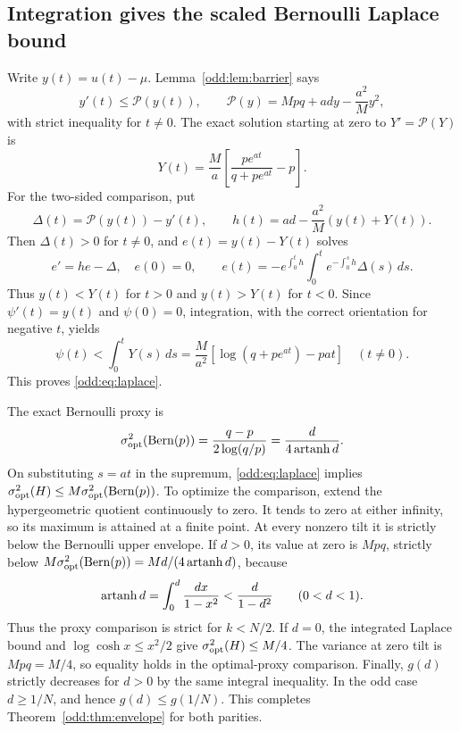 \subsection{Integration gives the scaled Bernoulli Laplace bound}
Write $y(t)=u(t)-\mu$. Lemma~\ref{odd:lem:barrier} says
\[
 y'(t)\le \mathcal P(y(t)),\qquad
 \mathcal P(y)=Mpq+ady-\frac{a^2}{M}y^2,
\]
with strict inequality for $t\ne0$. The exact solution starting at zero to
$Y'=\mathcal P(Y)$ is
\begin{equation}\label{odd:eq:Y}
 Y(t)=\frac{M}{a}\left[\frac{pe^{at}}{q+pe^{at}}-p\right].
\end{equation}
For the two-sided comparison, put
\[
 \Delta(t)=\mathcal P(y(t))-y'(t),\qquad
 h(t)=ad-\frac{a^2}{M}(y(t)+Y(t)).
\]
Then $\Delta(t)>0$ for $t\ne0$, and $e(t)=y(t)-Y(t)$ solves
\[
 e'=he-\Delta,\quad e(0)=0,\qquad
 e(t)=-e^{\int_0^t h}\int_0^t e^{-\int_0^s h}\Delta(s)\,ds.
\]
Thus $y(t)<Y(t)$ for $t>0$ and $y(t)>Y(t)$ for $t<0$.
Since $\psi'(t)=y(t)$ and $\psi(0)=0$, integration, with the correct orientation for negative $t$, yields
\[
 \psi(t)<\int_0^tY(s)\,ds
 =\frac{M}{a^2}[\log(q+pe^{at})-pat]\quad(t\ne0).
\]
This proves \eqref{odd:eq:laplace}.

The exact Bernoulli proxy is
\begin{equation}\label{odd:eq:bern}
 \sigma^2_{\rm opt}(\operatorname{Bern}(p))=\frac{q-p}{2\log(q/p)}
 =\frac{d}{4\operatorname{artanh} d}.
\end{equation}
On substituting $s=at$ in the supremum, \eqref{odd:eq:laplace} implies
$\sigma^2_{\rm opt}(H)\le M\sigma^2_{\rm opt}(\operatorname{Bern}(p))$.
To optimize the comparison, extend the hypergeometric quotient continuously to zero. It tends to zero at either infinity, so its maximum is attained at a finite point. At every nonzero tilt it is strictly below the Bernoulli upper envelope. If $d>0$, its value at zero is $Mpq$, strictly below $M\sigma^2_{\rm opt}(\operatorname{Bern}(p))=Md/(4\operatorname{artanh} d)$, because
\[
 \operatorname{artanh} d=\int_0^d\frac{dx}{1-x^2}<\frac{d}{1-d^2}\qquad(0<d<1).
\]
Thus the proxy comparison is strict for $k<N/2$. If $d=0$, the integrated Laplace bound and $\log\cosh x\le x^2/2$ give $\sigma^2_{\rm opt}(H)\le M/4$. The variance at zero tilt is $Mpq=M/4$, so equality holds in the optimal-proxy comparison. Finally, $g(d)$ strictly decreases for $d>0$ by the same integral inequality. In the odd case $d\ge1/N$, and hence $g(d)\le g(1/N)$. This completes Theorem~\ref{odd:thm:envelope} for both parities.

